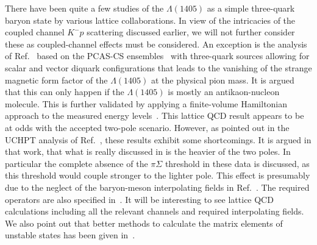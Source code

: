 There have been quite a few studies of the $\Lambda(1405)$ as a simple
three-quark baryon state by various lattice collaborations. In view of the
intricacies of the coupled channel $K^- p$ scattering discussed earlier,
we will not further consider these as coupled-channel effects must be 
considered.
An exception is the analysis of Ref.~\cite{Hall:2014uca}  based on 
the PCAS-CS ensembles~\cite{Aoki:2008sm} 
with  three-quark sources allowing for scalar and vector diquark configurations
that leads to the vanishing of the strange magnetic form factor of the 
$\Lambda(1405)$
at the physical pion mass. It is argued that this can only happen if the
$\Lambda(1405)$ is mostly an antikaon-nucleon molecule. This is further 
validated
by applying a finite-volume Hamiltonian approach to the measured energy 
levels~\cite{Wu:2014vma}. This lattice QCD result appears to be at odds with the
accepted two-pole scenario. However, as pointed out in the UCHPT analysis of 
Ref.~\cite{Molina:2015uqp}, these results exhibit some shortcomings. It is
argued in that work, that what is really discussed in \cite{Hall:2014uca} is 
the heavier of the two poles. In particular the complete absence of the 
$\pi \Sigma$ threshold in these data is discussed, as this threshold  would couple
stronger to the lighter pole. This effect is presumably due to the neglect of 
the baryon-meson interpolating fields in Ref.~\cite{Hall:2014uca}. The required
operators are also specified in~\cite{Molina:2015uqp}. It will be interesting to see
lattice QCD {calculations} including all the relevant channels and required
interpolating fields. {We also point out that
better methods to calculate the matrix elements of unstable states has been
given in~\cite{Bernard:2012bi,Briceno:2015tza}.}
